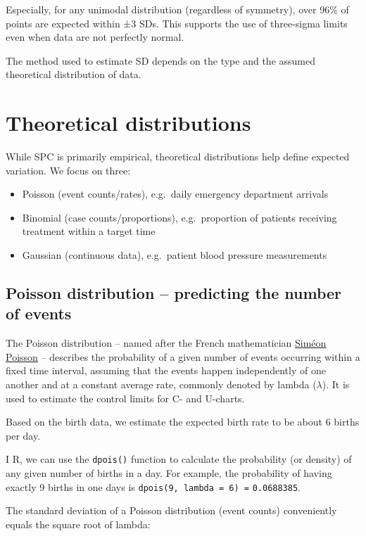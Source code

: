 \documentclass[
]{book}
\providecommand{\tightlist}{%
  \setlength{\itemsep}{0pt}\setlength{\parskip}{0pt}}
\begin{document}
Especially, for any unimodal distribution (regardless of symmetry), over 96\% of points are expected within ±3 SDs. This supports the use of three-sigma limits even when data are not perfectly normal.

The method used to estimate SD depends on the type and the assumed theoretical distribution of data.

\section{Theoretical distributions}\label{theoretical-distributions}

While SPC is primarily empirical, theoretical distributions help define expected variation. We focus on three:

\begin{itemize}
\tightlist
\item
  Poisson (event counts/rates), e.g.~daily emergency department arrivals
\item
  Binomial (case counts/proportions), e.g.~proportion of patients receiving treatment within a target time
\item
  Gaussian (continuous data), e.g.~patient blood pressure measurements
\end{itemize}

\subsection{Poisson distribution -- predicting the number of events}\label{poisson-distribution-predicting-the-number-of-events}

The Poisson distribution -- named after the French mathematician \href{https://en.wikipedia.org/wiki/Sim\%C3\%A9on_Denis_Poisson}{Siméon Poisson} -- describes the probability of a given number of events occurring within a fixed time interval, assuming that the events happen independently of one another and at a constant average rate, commonly denoted by lambda (\(\lambda\)). It is used to estimate the control limits for C- and U-charts.

Based on the birth data, we estimate the expected birth rate to be about 6 births per day.

I R, we can use the \texttt{dpois()} function to calculate the probability (or density) of any given number of births in a day. For example, the probability of having exactly 9 births in one days is \texttt{dpois(9,\ lambda\ =\ 6)\ =} \texttt{0.0688385}.

The standard deviation of a Poisson distribution (event counts) conveniently equals the square root of lambda:
\end{document}
